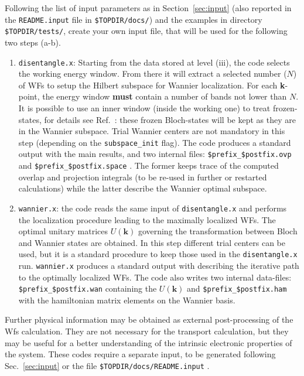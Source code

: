 Following the list of input parameters as in
Section~\ref{sec:input} (also reported in the {\tt README.input} file
in {\tt \$TOPDIR/docs/}) and the examples in directory {\tt \$TOPDIR/tests/},
create your own input file, that will be used for the following two steps (a-b).
\renewcommand{\theenumi}{\alph{enumi}}
\renewcommand{\labelenumi}{\theenumi)}
%
%
\begin{enumerate}
\item {\tt disentangle.x}: Starting from the data stored at level (iii),
      the code selects the working energy window. From there
      it will extract a selected number ($N$) of WFs to setup the
      Hilbert subspace for Wannier localization.
      For each \textbf{k}-point, the energy window {\bf must}
      contain a number of bands not lower than $N$.
      It is possible to use an inner window (inside the working one) to
      treat frozen-states, for details see Ref.~\cite{ivo2}:
      these frozen Bloch-states will be kept as they are in the Wannier subspace.
      Trial Wannier centers are not mandatory in this step (depending
      on the {\tt subspace\_init} flag).
      The code produces a standard output with the main results,
      and two internal files: {\tt \$prefix\_\$postfix.ovp} and
      {\tt \$prefix\_\$postfix.space} . The former keeps trace of the
      computed overlap and projection integrals (to be re-used in further
      or restarted calculations) while the latter describe the Wannier optimal
      subspace.

\item {\tt wannier.x}: the code reads the same input of {\tt disentangle.x} and
      performs the localization
      procedure leading to the maximally localized WFs.
      The optimal unitary matrices $U(\mathbf{k})$ governing the transformation between
      Bloch and Wannier states are obtained.
      In this step different trial centers can be used, but it is a standard procedure
      to keep those used in the {\tt disentangle.x} run.
      {\tt wannier.x} produces a standard output with describing the iterative
      path to the optimally localized WFs.
      The code also writes two internal data-files: {\tt \$prefix\_\$postfix.wan}
      containing the $U(\mathbf{k})$ and {\tt \$prefix\_\$postfix.ham} with the
      hamiltonian matrix elements on the Wannier basis.
\end{enumerate}
%
%

\noindent
Further physical information may be obtained as external
post-processing of the Wfs calculation. They are not necessary for
the transport calculation, but they may be useful for a
better understanding of the intrinsic electronic properties of the
system. These codes require a separate input, to be generated
following Sec.~\ref{sec:input} or the file
{\tt \$TOPDIR/docs/README.input} .

